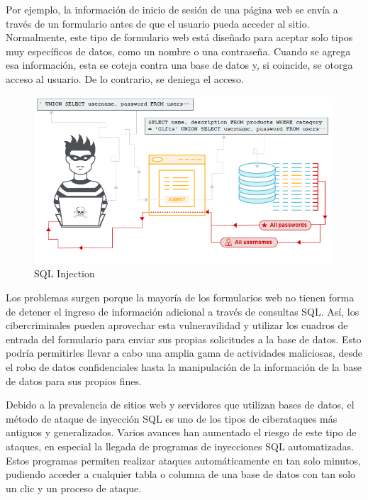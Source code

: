 Por ejemplo, la información de inicio de sesión de una página web se envía a través de un formulario antes de que el usuario pueda acceder al sitio. Normalmente, 
este tipo de formulario web está diseñado para aceptar solo tipos muy específicos de datos, como un nombre o una contraseña. Cuando se agrega esa información, 
esta se coteja contra una base de datos y, si coincide, se otorga acceso al usuario. De lo contrario, se deniega el acceso.

\begin{figure}[tphb]
  		   \centering
     		   \includegraphics[width=5in]{sqli.png}
  		   \caption{SQL Injection \cite{sqli}}
  		   \label{img:sqli}
\end{figure}

Los problemas surgen porque la mayoría de los formularios web no tienen forma de detener el ingreso de información adicional a través de consultas SQL. Así, los 
cibercriminales pueden aprovechar esta vulneravilidad y utilizar los cuadros de entrada del formulario para enviar sus propias solicitudes a la base de datos. Esto 
podría permitirles llevar a cabo una amplia gama de actividades maliciosas, desde el robo de datos confidenciales hasta la manipulación de la información de la base 
de datos para sus propios fines.

Debido a la prevalencia de sitios web y servidores que utilizan bases de datos, el método de ataque de inyección SQL es uno de los tipos de ciberataques más antiguos 
y generalizados. Varios avances han aumentado el riesgo de este tipo de ataques, en especial la llegada de programas de inyecciones SQL automatizadas. Estos
programas permiten realizar ataques automáticamente en tan solo minutos, pudiendo acceder a cualquier tabla o columna de una base de datos con tan solo un clic 
y un proceso de ataque.


